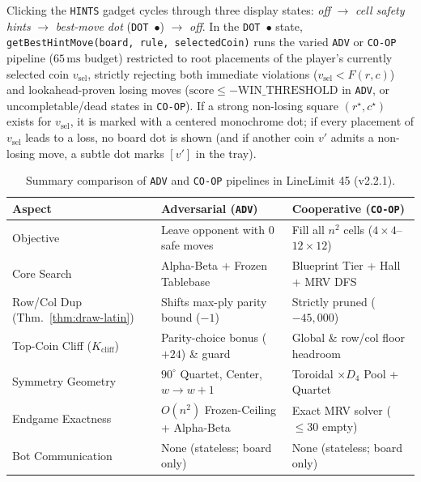 \documentclass[10pt,a4paper]{article}
\theoremstyle{remark}
\begin{document}
Clicking the \texttt{HINTS} gadget cycles through three display states: \emph{off} $\to$ \emph{cell safety hints} $\to$ \emph{best-move dot} (\texttt{DOT~$\bullet$}) $\to$ \emph{off}. In the \texttt{DOT~$\bullet$} state, \texttt{getBestHintMove(\allowbreak board, \allowbreak rule, \allowbreak selectedCoin)} runs the varied \texttt{ADV} or \texttt{CO-OP} pipeline ($65\,\mathrm{ms}$ budget) restricted to root placements of the player's currently selected coin $v_{\mathrm{sel}}$, strictly rejecting both immediate violations ($v_{\mathrm{sel}} < F(r,c)$) and lookahead-proven losing moves ($\mathrm{score} \le -\mathrm{WIN\_THRESHOLD}$ in \texttt{ADV}, or uncompletable/dead states in \texttt{CO-OP}). If a strong non-losing square $(r^\star, c^\star)$ exists for $v_{\mathrm{sel}}$, it is marked with a centered monochrome dot; if every placement of $v_{\mathrm{sel}}$ leads to a loss, no board dot is shown (and if another coin $v'$ admits a non-losing move, a subtle dot marks $[v']$ in the tray).

\begin{table}[htbp]
\centering
\footnotesize
\setlength{\tabcolsep}{5pt}
\begin{tabular*}{\textwidth}{@{\extracolsep{\fill}}lll@{}}
\toprule
\textbf{Aspect} & \textbf{Adversarial (\texttt{ADV})} & \textbf{Cooperative (\texttt{CO-OP})} \\
\midrule
Objective & Leave opponent with $0$ safe moves & Fill all $n^2$ cells ($4\times 4$--$12\times 12$) \\
Core Search & Alpha-Beta + Frozen Tablebase & Blueprint Tier + Hall + MRV DFS \\
Row/Col Dup (Thm.~\ref{thm:draw-latin}) & Shifts max-ply parity bound ($-1$) & Strictly pruned ($-45{,}000$) \\
Top-Coin Cliff ($K_{\mathrm{cliff}}$) & Parity-choice bonus ($+24$) \& guard & Global \& row/col floor headroom \\
Symmetry Geometry & $90^\circ$ Quartet, Center, $w\to w+1$ & Toroidal $\times D_4$ Pool + Quartet \\
Endgame Exactness & $O(n^2)$ Frozen-Ceiling + Alpha-Beta & Exact MRV solver ($\le 30$ empty) \\
Bot Communication & None (stateless; board only) & None (stateless; board only) \\
\bottomrule
\end{tabular*}
\caption{Summary comparison of \texttt{ADV} and \texttt{CO-OP} pipelines in LineLimit 45 (v2.2.1).}
\end{table}
\end{document}
